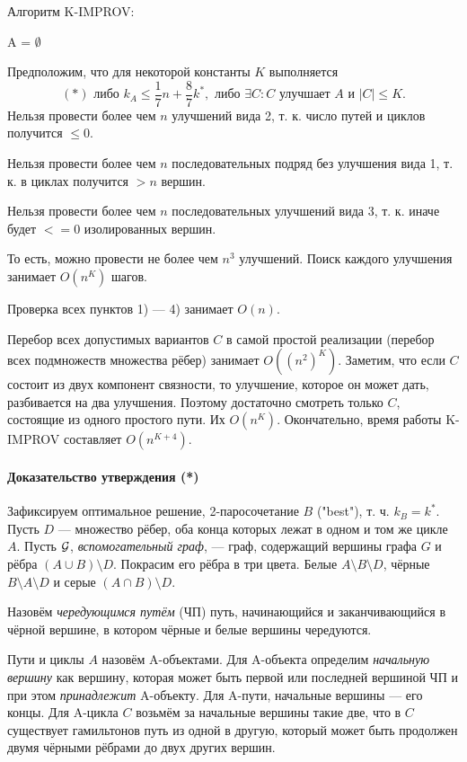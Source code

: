 Алгоритм K-IMPROV:

\begin{algorithm}[H]
 A = $\emptyset$\;
\end{algorithm}

Предположим, что для некоторой константы $K$ выполняется 
$$(*) \text{ либо } k_A \le \frac{1}{7}n+\frac{8}{7}k^*, \text{ либо } \exists C: C \text{ улучшает } A \textbf{ и } |C|\le K.$$
Нельзя провести более чем $n$ улучшений вида 2, т. к. число путей и циклов получится $\le0$.

Нельзя провести более чем $n$ последовательных подряд без улучшения вида 1, т. к. в циклах получится $>n$ вершин.

Нельзя провести более чем $n$ последовательных улучшений вида 3, т. к. иначе будет $<= 0$ изолированных вершин. 

То есть, можно провести не более чем $n^3$ улучшений. Поиск каждого улучшения занимает $O(n^K)$ шагов.

Проверка всех пунктов 1) --- 4) занимает $O(n)$.

Перебор всех допустимых вариантов $C$ в самой простой реализации (перебор всех подмножеств множества рёбер) занимает $O((n^2)^K)$. Заметим, что если $C$ состоит из двух компонент связности, то улучшение, которое он может дать, разбивается на два улучшения. Поэтому достаточно смотреть только $C$, состоящие из одного простого пути. Их $O(n^K)$. Окончательно, время работы K-IMPROV составляет $O(n^{K+4})$.

\paragraph{Доказательство утверждения (*)}
Зафиксируем оптимальное решение, 2-паросочетание $B$ ("best"), т. ч. $k_B = k^*$. Пусть $D$ --- множество рёбер, оба конца которых лежат в одном и том же цикле $A$. Пусть $\mathcal{G}$, \textit{вспомогательный граф}, --- граф, содержащий вершины графа $G$ и рёбра $(A \cup B) \setminus D$. Покрасим его рёбра в три цвета.
Белые $A \setminus B \setminus D$, чёрные $B \setminus A \setminus D$ и серые $(A \cap B) \setminus D$. 

Назовём \textit{чередующимся путём} (ЧП) путь, начинающийся и заканчивающийся в чёрной вершине, в котором чёрные и белые вершины чередуются.

Пути и циклы $A$ назовём A-объектами. Для A-объекта определим \textit{начальную вершину} как вершину, которая может быть первой или последней вершиной ЧП и при этом \textit{принадлежит} A-объекту. Для A-пути, начальные вершины --- его концы. Для A-цикла $C$ возьмём за начальные вершины такие две, что в $C$ существует гамильтонов путь из одной в другую, который может быть продолжен двумя чёрными рёбрами до двух других вершин. 

